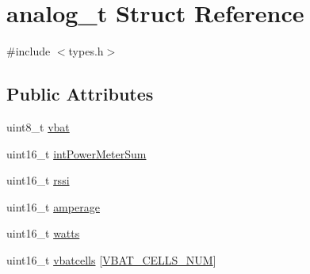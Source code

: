 \hypertarget{structanalog__t}{\section{analog\-\_\-t Struct Reference}
\label{structanalog__t}
}


{\ttfamily \#include $<$types.\-h$>$}

\subsection*{Public Attributes}
\begin{DoxyCompactItemize}
\item 
uint8\-\_\-t \hyperlink{structanalog__t_a22cecf19aae154eaf1dd1830db749739}{vbat}
\item 
uint16\-\_\-t \hyperlink{structanalog__t_ab3c586d0ea00744a3a2d0dd8f728a859}{int\-Power\-Meter\-Sum}
\item 
uint16\-\_\-t \hyperlink{structanalog__t_a4e9074c00d8a5ab787ca9957163cef69}{rssi}
\item 
uint16\-\_\-t \hyperlink{structanalog__t_ae71f1d51a99a36ca2d5d85a492d13e8c}{amperage}
\item 
uint16\-\_\-t \hyperlink{structanalog__t_a65857b84b3f0ca6fb9bccdc6ed605a68}{watts}
\item 
uint16\-\_\-t \hyperlink{structanalog__t_a007631968079c7805e329c9d4356ac35}{vbatcells} \mbox{[}\hyperlink{Uno__MultiWii__HardwarePlatform__Test_2config_8h_a015b5ca68293dd38e63261af0d87df19}{V\-B\-A\-T\-\_\-\-C\-E\-L\-L\-S\-\_\-\-N\-U\-M}\mbox{]}
\end{DoxyCompactItemize}


